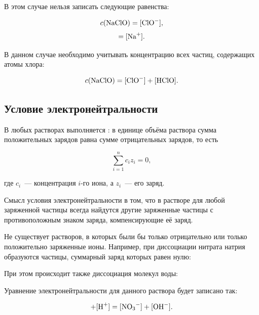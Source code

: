 
В этом случае нельзя записать следующие равенства:

\begin{equation*}
    c(\ce{NaClO}) = [\ce{ClO^-}],
\end{equation*}
\begin{equation*}
    [\ce{ClO^-}] = [\ce{Na^+}].
\end{equation*}

В данном случае необходимо учитывать концентрацию всех частиц, содержащих атомы хлора:

\begin{equation*}
    c(\ce{NaClO}) = [\ce{ClO^-}] + [\ce{HClO}].
\end{equation*}

\subsection*{Условие электронейтральности}

В любых растворах выполняется : в единице объёма раствора сумма положительных зарядов равна сумме отрицательных зарядов, то есть

\begin{equation*}
    \boxed{\sum_{i = 1}^{n} c_iz_i = 0},
\end{equation*}

где $c_i$~--- концентрация $i$-го иона, а $z_i$~--- его заряд.

Смысл условия электронейтральности в том, что в растворе для любой заряженной частицы всегда найдутся другие заряженные частицы с противоположным знаком заряда, компенсирующие её заряд.

Не существует растворов, в которых были бы только отрицательно или только положительно заряженные ионы. Например, при диссоциации нитрата натрия образуются частицы, суммарный заряд которых равен нулю:


При этом происходит также диссоциация молекул воды:


Уравнение электронейтральности для данного раствора будет записано так:

\begin{equation*}
    [\ce{Na^+}] + [\ce{H^+}] = [\ce{NO3^-}] + [\ce{OH^-}].
\end{equation*}

